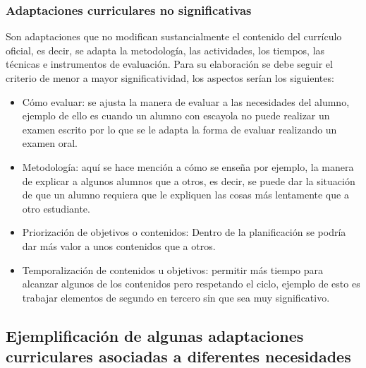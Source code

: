 \subsubsection{Adaptaciones curriculares no significativas}
Son adaptaciones que no modifican sustancialmente el contenido del currículo oficial, es decir, se adapta la metodología, las actividades, los tiempos, las técnicas e instrumentos de evaluación. Para su elaboración se debe  seguir el criterio de menor a mayor significatividad, los aspectos serían los siguientes:
\begin{itemize}
    \item Cómo evaluar: se ajusta la manera de evaluar a las necesidades del alumno, ejemplo de ello es cuando un alumno con escayola no puede realizar un examen escrito por lo que se le adapta la forma de evaluar realizando un examen oral.
    \item Metodología: aquí se hace mención a cómo se enseña por ejemplo, la manera de explicar a algunos alumnos que a otros, es decir, se puede dar la situación de que un alumno requiera que le expliquen las cosas más lentamente que a otro estudiante.
    \item Priorización de objetivos o contenidos: Dentro de la planificación se podría dar más valor a unos contenidos que a otros.
    \item Temporalización de contenidos u objetivos: permitir más tiempo para alcanzar algunos de los contenidos pero respetando el ciclo, ejemplo de esto es trabajar elementos de segundo en tercero sin que sea muy significativo.
\end{itemize}

\subsection{Ejemplificación de algunas adaptaciones curriculares asociadas a diferentes necesidades }

